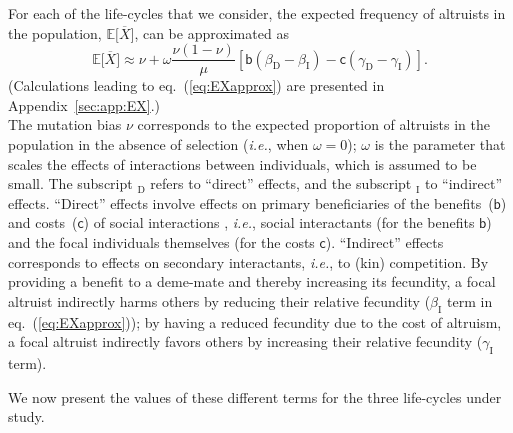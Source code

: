 \documentclass[11pt, letterpaper]{article}
\renewcommand{\eqref}[1]{\textup{{\normalfont eq.~(\ref{#1}}\normalfont)}}
\newcommand{\ie}{\textit{i.e.}}
\newcommand{\Esp}[1]{\mathbb{E}\big[ #1\big]}%
\newcommand{\appname}[0]{Appendix}
\newcommand{\bb}{\mathsf{b}}
\newcommand{\cc}{\mathsf{c}}
\newcommand{\direct}{\mathrm{D}}
\newcommand{\indirect}{\mathrm{I}}
\newcommand{\mutbias}{\nu}
\begin{document}
For each of the life-cycles that we consider, the expected frequency of altruists in the population, $\Esp{\overline{X}}$, can be approximated as
\begin{equation}\label{eq:EXapprox}
\Esp{\overline{X}} \approx \mutbias + \omega \frac{\mutbias (1-\mutbias)}{\mu} \left[ \bb \left( \beta_{\direct} - \beta_{\indirect} \right) - \cc \left( \gamma_{\direct} - \gamma_{\indirect} \right) \right].
\end{equation}
(Calculations leading to \eqref{eq:EXapprox} are presented in  \appname~\ref{sec:app:EX}.)\\
The mutation bias $\mutbias$ corresponds to the expected proportion of altruists in the population in the absence of selection (\ie, when $\omega = 0$); $\omega$ is the parameter that scales the effects of interactions between individuals, which is assumed to be small. The subscript $_{\direct}$ refers to ``direct'' effects, and the subscript $_{\indirect}$ to ``indirect'' effects. ``Direct'' effects involve effects on primary beneficiaries of the benefits~($\bb$) and costs~($\cc$) of social interactions \citep{WestGardner2010}, \ie, social interactants (for the benefits $\bb$) and the focal individuals themselves (for the costs $\cc$). ``Indirect'' effects corresponds to effects on secondary interactants, \ie, to (kin) competition. By providing a benefit to a deme-mate and thereby increasing its fecundity, a focal altruist indirectly harms others by reducing their relative fecundity ($\beta_{\indirect}$ term in \eqref{eq:EXapprox}); by having a reduced fecundity due to the cost of altruism, a focal altruist indirectly favors others by increasing their relative fecundity ($\gamma_{\indirect}$ term).

We now present the values of these different terms for the three life-cycles under study.  
\end{document}

